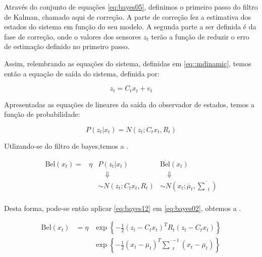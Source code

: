Através do conjunto de equações \ref{eq:bayes05}, definimos o primeiro passo do filtro de Kalman, chamado aqui de correção. A parte de correção fez a estimativa dos estados do sistema em função do seu modelo.
A segunda parte a ser definida é da fase de correção, onde o valores dos sensores $z_t$ terão a função de reduzir o erro de estimação definido no primeiro passo.

Assim, relembrando as equações do sistema, definidas em \ref{eq::mdinamic}, temos então a equação de saída do sistema, definida por:

\begin{equation}
    \label{eq:bayes10}
    z_t = C_t x_t + v_t
\end{equation}

Apresentadas as equações de lineares da saída do observador de estados, temos a função de probabilidade:

\begin{equation}
    \label{eq:bayes11}
    P(z_t| x_t)= N\left(z_t; C_t x_t, R_t\right)
\end{equation}   

Utlizando-se do filtro de bayes,temos a .

\begin{equation}
    \label{eq:bayes12}
    \begin{matrix}
        \text{Bel}(x_t) = &  \eta & P(z_t| x_t) & \overline{\text{Bel}}(x_t) \\
        & & \quad \Downarrow & \quad\Downarrow \\
        & & \sim N\left(z_t; C_t x_t, R_t\right) & \sim N\left(x_t; \overline{\mu}_t, \overline{\textstyle\sum}_t\right) \\
    \end{matrix}
\end{equation}

Desta forma, pode-se então aplicar \ref{eq:bayes12} em \ref{eq:bayes02}, obtemos a .

\begin{equation}
    \label{eq:bayes13}
    \begin{matrix}
        \text{Bel}(x_t)  & = \eta & \exp\left\{  -\displaystyle\frac{1}{2} \left(z_t - C_t x_t\right)^T R_t \left(z_t - C_t x_t\right)  \right\} \\
        & & \exp\left\{ -\displaystyle\frac{1}{2} \left(x_t - \overline{\mu}_t\right)^T \overline{\textstyle\sum}_t^{-1} \left(x_t - \overline{\mu}_t\right) \right\}
    \end{matrix}
\end{equation}

